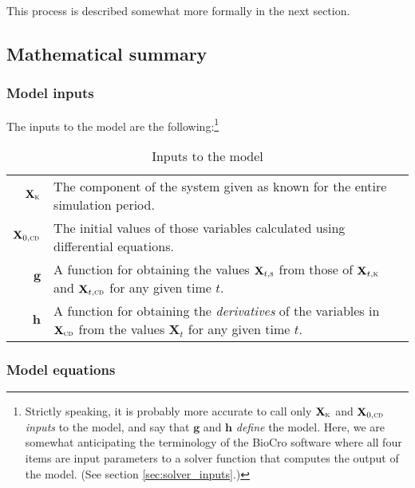 \documentclass{article}\usepackage[]{graphicx}\usepackage[]{color}
\makeatletter
\newenvironment{descriptions}
  {\par\vspace{\abovedisplayskip}\begin{tabular}{>{$}r<{$} @{$:{}$} p{40em}}}
  {\end{tabular}\par\vspace{\belowdisplayskip}}
\newcommand{\boldX}{\mathbf{X}}
\newcommand{\cd}{\textsc{cd}}
\newcommand{\kn}{\textsc{k}} %
\newcommand{\s}{\textsc{s}} %
\newcommand{\g}{\mathbf{g}}
\newcommand{\h}{\mathbf{h}}
\makeatother
\begin{document}
This process is described somewhat more formally in the next section.

\subsection{Mathematical summary}
\label{sec:math_summary}

\subsubsection{Model inputs}
\label{sec:model_inputs}
The inputs to the model are the following:\footnote{Strictly speaking,
  it is probably more accurate to call only $\boldX_\kn$ and
  $\boldX_{0,\cd}$ \emph{inputs} to the model, and say that $\g$ and
  $\h$ \emph{define} the model.  Here, we are somewhat anticipating
  the terminology of the BioCro software where all four items are
  input parameters to a solver function that computes the output of
  the model.  (See section \ref{sec:solver_inputs}.)}

\begin{table}[!htbp]
  \begin{center}
    \begin{descriptions}

	  \boldX_\kn & The component of the system given as known for the
      entire simulation period. \\

	  \boldX_{0,\cd} & The initial values of those variables
      calculated using differential equations. \\

	  \g & A function for obtaining the values $\boldX_{t,\s}$ from
      those of $\boldX_{t,\kn}$ and $\boldX_{t,\cd}$ for any given
      time $t$. \\

	  \h & A function for obtaining the \emph{derivatives} of the
      variables in $\boldX_\cd$ from the values $\boldX_t$ for any
      given time $t$.

    \end{descriptions}
    \caption{\label{tab:model_inputs}Inputs to the model}
  \end{center}
\end{table}



\subsubsection{Model equations}
\label{sec:model_equations}
\end{document}
